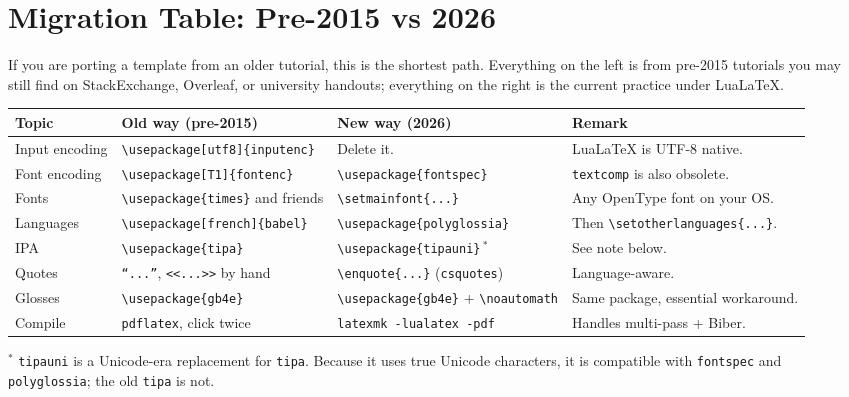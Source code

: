 \documentclass[11pt,a4paper]{article}
\begin{document}
\section{Migration Table: Pre-2015 vs 2026}

If you are porting a template from an older tutorial, this is the shortest path. Everything on the left is from pre-2015 tutorials you may still find on StackExchange, Overleaf, or university handouts; everything on the right is the current practice under LuaLaTeX.

\begin{center}
\small
\renewcommand{\arraystretch}{1.6}  %
\begin{tabular}{p{1.4cm} p{4.6cm} p{4.3cm} p{3cm}}
\toprule
\textbf{Topic} & \textbf{Old way (pre-2015)} & \textbf{New way (2026)} & \textbf{Remark} \\
\midrule
Input encoding & \texttt{\textbackslash usepackage[utf8]\{inputenc\}} & Delete it. & LuaLaTeX is UTF-8 native. \\
Font encoding & \texttt{\textbackslash usepackage[T1]\{fontenc\}} & \texttt{\textbackslash usepackage\{fontspec\}} & \texttt{textcomp} is also obsolete. \\
Fonts & \texttt{\textbackslash usepackage\{times\}} and friends & \texttt{\textbackslash setmainfont\{...\}} & Any OpenType font on your OS. \\
Languages & \texttt{\textbackslash usepackage[french]\{babel\}} & \texttt{\textbackslash usepackage\{polyglossia\}} & Then \texttt{\textbackslash setotherlanguages\{...\}}. \\
IPA & \texttt{\textbackslash usepackage\{tipa\}} & \texttt{\textbackslash usepackage\{tipauni\}}\,$^{\ast}$ & See note below. \\
Quotes & \texttt{``...''}, \texttt{<<...>>} by hand & \texttt{\textbackslash enquote\{...\}} (\texttt{csquotes}) & Language-aware. \\
Glosses & \texttt{\textbackslash usepackage\{gb4e\}} & \texttt{\textbackslash usepackage\{gb4e\}} + \texttt{\textbackslash noautomath} & Same package, essential workaround. \\
Compile & \texttt{pdflatex}, click twice & \texttt{latexmk -lualatex -pdf} & Handles multi-pass + Biber. \\
\bottomrule
\end{tabular}
\end{center}

\noindent $^{\ast}$ \texttt{tipauni} is a Unicode-era replacement for \texttt{tipa}. Because it uses true Unicode characters, it is compatible with \texttt{fontspec} and \texttt{polyglossia}; the old \texttt{tipa} is not.
\end{document}

